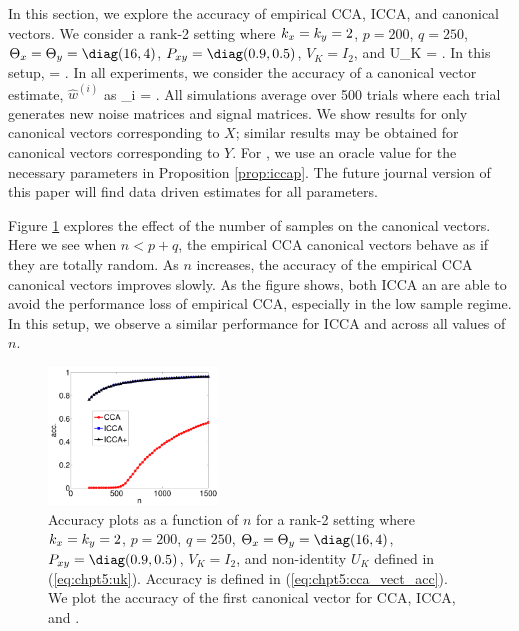In this section, we explore the accuracy of empirical CCA, ICCA, and \iccap canonical vectors. We consider a rank-2 setting where $k_x=k_y=2$, $p=200$, $q=250$,
$\Tx=\Ty=\diag(16,4)$, $\Pxy=\diag(0.9,0.5)$, $V_K=I_2$, and
\beq\label{eq:chpt5:uk}
U_K = \left[\begin{array}{cc} 1 & -2 \\ 2 & 1\end{array}\right].
\eeq
In this setup,
\be
\Uktil = \left[\begin{array}{cc} -0.8559 & -0.5172 \\ -0.5172 & 0.8559\end{array}\right].
\ee
In all experiments, we consider the accuracy of a canonical vector estimate, $\widehat{w}^{(i)}$ as
\beq\label{eq:chpt5:cca_vect_acc}
_i = .
\eeq
All simulations average over 500 trials where each trial generates new noise matrices and
signal matrices. We show results for only canonical vectors corresponding to $X$; similar
results may be obtained for canonical vectors corresponding to $Y$. For \iccaps, we use an
oracle value for the necessary parameters in Proposition \ref{prop:iccap}. The future
journal version of this paper will find data driven estimates for all parameters.

Figure \ref{fig:chpt5:n_sweep} explores the effect of the number of samples on the
canonical vectors. Here we see when $n<p+q$, the empirical CCA canonical vectors behave as
if they are totally random. As $n$ increases, the accuracy of the empirical CCA canonical
vectors improves slowly. As the figure shows, both ICCA an \iccap are able to avoid the
performance loss of empirical CCA, especially in the low sample regime. In this setup, we
observe a similar performance for ICCA and \iccap across all values of $n$. 

\begin{figure}
  \centering
  \includegraphics[width=0.4\textwidth]{chpt5_icca_vect/figs/asilomar_n.pdf}  
  \caption{Accuracy plots as a function of $n$ for a rank-2 setting where $k_x=k_y=2$,
      $p=200$, $q=250$, $\Tx=\Ty=\diag(16,4)$, $\Pxy=\diag(0.9,0.5)$, $V_K=I_2$, and
      non-identity $U_K$ defined in (\ref{eq:chpt5:uk}). Accuracy is defined in
      (\ref{eq:chpt5:cca_vect_acc}). We plot the accuracy of the first canonical vector
      for CCA, ICCA, and \iccaps.}
  \label{fig:chpt5:n_sweep}
\end{figure}

